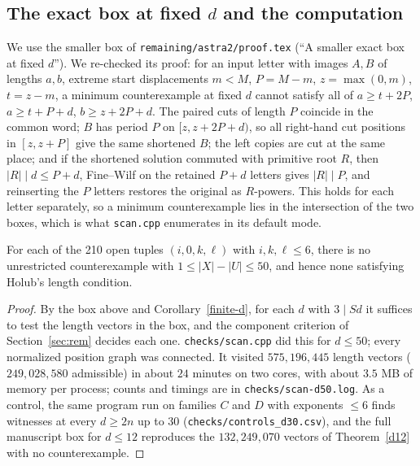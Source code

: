 \subsection{The exact box at fixed \(d\) and the computation}
We use the smaller box of \texttt{remaining/astra2/proof.tex} (``A smaller exact box at fixed \(d\)''). We re-checked its proof: for an input letter with images \(A,B\) of lengths \(a,b\), extreme start displacements \(m<M\), \(P=M-m\), \(z=\max(0,m)\), \(t=z-m\), a minimum counterexample at fixed \(d\) cannot satisfy all of \(a\ge t+2P\), \(a\ge t+P+d\), \(b\ge z+2P+d\). The paired cuts of length \(P\) coincide in the common word; \(B\) has period \(P\) on \([z,z+2P+d)\), so all right-hand cut positions in \([z,z+P]\) give the same shortened \(B\); the left copies are cut at the same place; and if the shortened solution commuted with primitive root \(R\), then \(|R|\mid d\le P+d\), Fine--Wilf on the retained \(P+d\) letters gives \(|R|\mid P\), and reinserting the \(P\) letters restores the original as \(R\)-powers. This holds for each letter separately, so a minimum counterexample lies in the intersection of the two boxes, which is what \texttt{scan.cpp} enumerates in its default mode.

\begin{theorem}\label{d50}
For each of the 210 open tuples \((i,0,k,\ell)\) with \(i,k,\ell\le6\), there is no unrestricted counterexample with \(1\le |X|-|U|\le 50\), and hence none satisfying Holub's length condition.
\end{theorem}
\begin{proof}
By the box above and Corollary~\ref{finite-d}, for each \(d\) with \(3\mid Sd\) it suffices to test the length vectors in the box, and the component criterion of Section~\ref{sec:rem} decides each one. \texttt{checks/scan.cpp} did this for \(d\le50\); every normalized position graph was connected. It visited \(575{,}196{,}445\) length vectors (\(249{,}028{,}580\) admissible) in about \(24\) minutes on two cores, with about \(3.5\) MB of memory per process; counts and timings are in \texttt{checks/scan-d50.log}. As a control, the same program run on families \(C\) and \(D\) with exponents \(\le6\) finds witnesses at every \(d\ge 2n\) up to \(30\) (\texttt{checks/controls\_d30.csv}), and the full manuscript box for \(d\le12\) reproduces the \(132{,}249{,}070\) vectors of Theorem~\ref{d12} with no counterexample.
\end{proof}

